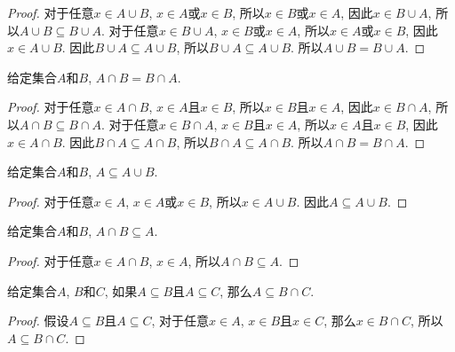 \begin{proof}
	对于任意$x\in A\cup B$, $x\in A$或$x\in B$, 所以$x\in B$或$x\in A$, 因此$x\in B\cup A$, 所以$A\cup B\subseteq B\cup A$. 对于任意$x\in B\cup A$, $x\in B$或$x\in A$, 所以$x\in A$或$x\in B$, 因此$x\in A\cup B$. 因此$B\cup A\subseteq A\cup B$, 所以$B\cup A\subseteq A\cup B$. 所以$A\cup B=B\cup A$.
\end{proof}

\begin{proposition}
	给定集合$A$和$B$, $A\cap B=B\cap A$.
\end{proposition}

\begin{proof}
	对于任意$x\in A\cap B$, $x\in A$且$x\in B$, 所以$x\in B$且$x\in A$, 因此$x\in B\cap A$, 所以$A\cap B\subseteq B\cap A$. 对于任意$x\in B\cap A$, $x\in B$且$x\in A$, 所以$x\in A$且$x\in B$, 因此$x\in A\cap B$. 因此$B\cap A\subseteq A\cap B$, 所以$B\cap A\subseteq A\cap B$. 所以$A\cap B=B\cap A$.
\end{proof}

\begin{proposition}
	给定集合$A$和$B$, $A\subseteq A\cup B$.
\end{proposition}

\begin{proof}
	对于任意$x\in A$, $x\in A$或$x\in B$, 所以$x\in A\cup B$. 因此$A\subseteq A\cup B$.
\end{proof}

\begin{proposition}
	给定集合$A$和$B$, $A\cap B\subseteq A$.
\end{proposition}

\begin{proof}
	对于任意$x\in A\cap B$, $x\in A$, 所以$A\cap B\subseteq A$.
\end{proof}

\begin{proposition}
	给定集合$A$, $B$和$C$, 如果$A\subseteq B$且$A\subseteq C$, 那么$A\subseteq B\cap C$.
\end{proposition}

\begin{proof}
	假设$A\subseteq B$且$A\subseteq C$, 对于任意$x\in A$, $x\in B$且$x\in C$, 那么$x\in B\cap C$, 所以$A\subseteq B\cap C$.
\end{proof}

